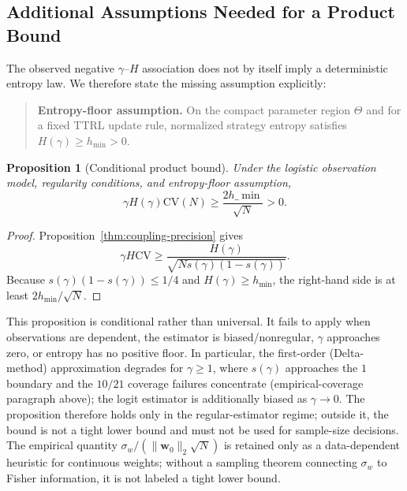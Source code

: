 \documentclass[11pt]{article}
\newtheorem{proposition}{Proposition}
\begin{document}
\subsection{Additional Assumptions Needed for a Product Bound}

The observed negative $\gamma$--$H$ association does not by itself imply a deterministic entropy law. We therefore state the missing assumption explicitly:

\begin{quote}
\textbf{Entropy-floor assumption.} On the compact parameter region $\Theta$ and for a fixed TTRL update rule, normalized strategy entropy satisfies $H(\gamma)\ge h_{\min}>0$.
\end{quote}

\begin{proposition}[Conditional product bound]\label{thm:impossibility}
Under the logistic observation model, regularity conditions, and entropy-floor assumption,
\[
\gamma H(\gamma)\mathrm{CV}(N)
\geq \frac{2h\_{\min}}{\sqrt N}>0.
\]
\end{proposition}

\begin{proof}
Proposition~\ref{thm:coupling-precision} gives
\[
\gamma H\mathrm{CV}\geq
\frac{H(\gamma)}{\sqrt{N s(\gamma)(1-s(\gamma))}}.
\]
Because $s(\gamma)(1-s(\gamma))\leq1/4$ and $H(\gamma)\ge h_{\min}$, the right-hand side is at least $2h_{\min}/\sqrt N$.
\end{proof}

This proposition is conditional rather than universal. It fails to apply when observations are dependent, the estimator is biased/nonregular, $\gamma$ approaches zero, or entropy has no positive floor. In particular, the first-order (Delta-method) approximation degrades for $\gamma\geq 1$, where $s(\gamma)$ approaches the $1$ boundary and the $10/21$ coverage failures concentrate (empirical-coverage paragraph above); the logit estimator is additionally biased as $\gamma\to 0$. The proposition therefore holds only in the regular-estimator regime; outside it, the bound is not a tight lower bound and must not be used for sample-size decisions. The empirical quantity $\sigma_w/(\|\mathbf{w}_0\|_2\sqrt N)$ is retained only as a data-dependent heuristic for continuous weights; without a sampling theorem connecting $\sigma_w$ to Fisher information, it is not labeled a tight lower bound.
\end{document}
